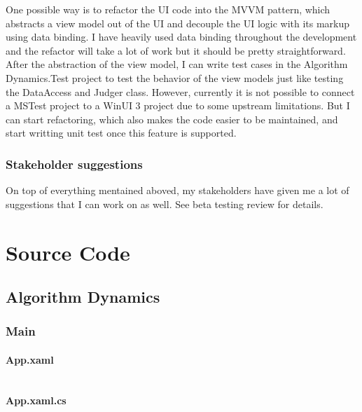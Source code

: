 \documentclass[a4paper]{report}
\begin{document}
One possible way is to refactor the UI code into the MVVM\cite{microsoft:docs:mvvm-introduction} pattern, which abstracts a view model out of the UI and decouple the UI logic with its markup using data binding\cite{microsoft:docs:data-binding-and-mvvm}. I have heavily used data binding throughout the development and the refactor will take a lot of work but it should be pretty straightforward. After the abstraction of the view model, I can write test cases in the Algorithm Dynamics.Test project to test the behavior of the view models just like testing the DataAccess and Judger class. However, currently it is not possible to connect a MSTest project to a WinUI 3 project due to some upstream limitations\cite{github:microsoft-ui-xaml:6258}. But I can start refactoring, which also makes the code easier to be maintained, and start writting unit test once this feature is supported.

\subsection{Stakeholder suggestions}

On top of everything mentained aboved, my stakeholders have given me a lot of suggestions that I can work on as well. See beta testing review for details.

\chapter{Source Code}

\section{Algorithm Dynamics}

\subsection{Main}

\subsubsection{App.xaml}

\inputminted{xml}{"../src/Algorithm Dynamics/App.xaml"}

\subsubsection{App.xaml.cs}

\inputminted{csharp}{"../src/Algorithm Dynamics/App.xaml.cs"}
\end{document}
